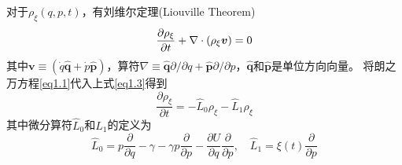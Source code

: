 对于$\rho_{\xi}(q,p,t)$，有刘维尔定理(Liouville Theorem)\cite{Wang2013}
\begin{equation}
    \frac{\partial \rho_{\xi}}{\partial t} + \nabla \cdot \left(\rho_{\xi} \bm{v} \right)=0
    \label{eq1.3}
\end{equation}
其中$\bm{v}\equiv\left(\dot{q}\hat{\mathbf{q}} + \dot{p}\hat{\mathbf{p}}\right)$，算符$\nabla \equiv \hat{\mathbf{q}} \partial / \partial q+\hat{\mathbf{p}} \partial / \partial p$，$\hat{\mathbf{q}}$和$\hat{\mathbf{p}}$是单位方向向量。
将朗之万方程\eqref{eq1.1}代入上式\eqref{eq1.3}得到
\begin{equation}
    \frac{\partial \rho_{\xi}}{\partial t}=-\hat{L}_{0} \rho_{\xi}-\hat{L}_{1} \rho_{\xi}
    \label{eq1.4}
\end{equation}
其中微分算符$\hat{L}_{0}$和$\hat{L}_{1}$的定义为
\begin{equation}
    \hat{L}_{0}=p \frac{\partial}{\partial q}-{\gamma}-{\gamma} p \frac{\partial}{\partial p}-\frac{\partial U}{\partial q} \frac{\partial}{\partial p},\quad \hat{L}_{1}= \xi(t) \frac{\partial}{\partial p}
    \label{eq1.5}
\end{equation}

